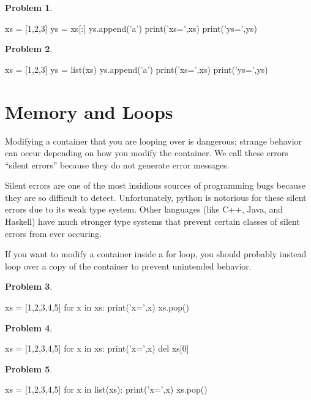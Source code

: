 \documentclass[12pt]{article}
\theoremstyle{definition}
\newtheorem{problem}{Problem}
\begin{document}
\begin{problem}
~~~
\begin{python}
xs = [1,2,3]
ys = xs[:]
ys.append('a')
print('xs=',xs)
print('ys=',ys)
\end{python}
\end{problem}
\vspace{2in}

\begin{problem}
~~~
\begin{python}
xs = [1,2,3]
ys = list(xs)
ys.append('a')
print('xs=',xs)
print('ys=',ys)
\end{python}
\end{problem}
\vspace{2in}

\newpage
\section{Memory and Loops}
\noindent
Modifying a container that you are looping over is dangerous;
strange behavior can occur depending on how you modify the container.
We call these errors ``silent errors'' because they do not generate error messages.

Silent errors are one of the most insidious sources of programming bugs because they are so difficult to detect.
Unfortunately, python is notorious for these silent errors due to its weak type system.
Other languages (like C++, Java, and Haskell) have much stronger type systems that prevent certain classes of silent errors from ever occuring.

If you want to modify a container inside a for loop,
you should probably instead loop over a copy of the container to prevent unintended behavior.

\begin{problem}
~~~
\begin{python}
xs = [1,2,3,4,5]
for x in xs:
    print('x=',x)
    xs.pop()
\end{python}
\end{problem}
\vspace{2in}

\begin{problem}
~~~
\begin{python}
xs = [1,2,3,4,5]
for x in xs:
    print('x=',x)
    del xs[0]
\end{python}
\end{problem}
\vspace{2in}

\newpage
\begin{problem}
~~~
\begin{python}
xs = [1,2,3,4,5]
for x in list(xs):
    print('x=',x)
    xs.pop()
\end{python}
\end{problem}
\vspace{2in}
\end{document}
